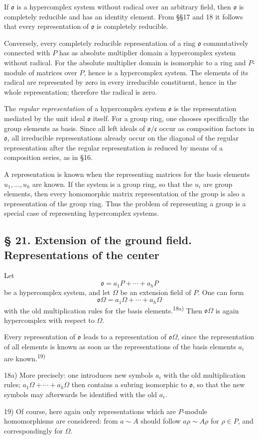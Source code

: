\documentclass[11pt]{article}
\providecommand{\mo}{\mathfrak{o}}
\providecommand{\mc}{\mathfrak{c}}
\begin{document}
If $\mo$ is a hypercomplex system without radical over an arbitrary field, then $\mo$ is completely reducible and has an identity element. From §§17 and 18 it follows that every representation of $\mo$ is completely reducible.

Conversely, every completely reducible representation of a ring $\mo$ commutatively connected with $P$ has as absolute multiplier domain a hypercomplex system without radical. For the absolute multiplier domain is isomorphic to a ring and $P$-module of matrices over $P$, hence is a hypercomplex system. The elements of its radical are represented by zero in every irreducible constituent, hence in the whole representation; therefore the radical is zero.

The \emph{regular representation} of a hypercomplex system $\mo$ is the representation mediated by the unit ideal $\mo$ itself. For a group ring, one chooses specifically the group elements as basis. Since all left ideals of $\mo/\mc$ occur as composition factors in $\mo$, all irreducible representations already occur on the diagonal of the regular representation after the regular representation is reduced by means of a composition series, as in §16.

A representation is known when the representing matrices for the basis elements $u_1,\ldots,u_h$ are known. If the system is a group ring, so that the $u_i$ are group elements, then every homomorphic matrix representation of the group is also a representation of the group ring. Thus the problem of representing a group is a special case of representing hypercomplex systems.

\subsection*{§ 21. Extension of the ground field. Representations of the center}
Let
\[
        \mo=a_1P+\cdots+a_hP
\]
be a hypercomplex system, and let $\Omega$ be an extension field of $P$. One can form
\[
        \mo\Omega=a_1\Omega+\cdots+a_h\Omega
\]
with the old multiplication rules for the basis elements.\textsuperscript{18a)} Then $\mo\Omega$ is again hypercomplex with respect to $\Omega$.

Every representation of $\mo$ leads to a representation of $\mo\Omega$, since the representation of all elements is known as soon as the representations of the basis elements $a_i$ are known.\textsuperscript{19)}

{\footnotesize\noindent 18a) More precisely: one introduces new symbols $a_i$ with the old multiplication rules; $a_1\Omega+\cdots+a_h\Omega$ then contains a subring isomorphic to $\mo$, so that the new symbols may afterwards be identified with the old $a_i$.\par
19) Of course, here again only representations which are $P$-module homomorphisms are considered: from $a\sim A$ should follow $a\rho\sim A\rho$ for $\rho\in P$, and correspondingly for $\Omega$.\par}
\end{document}
